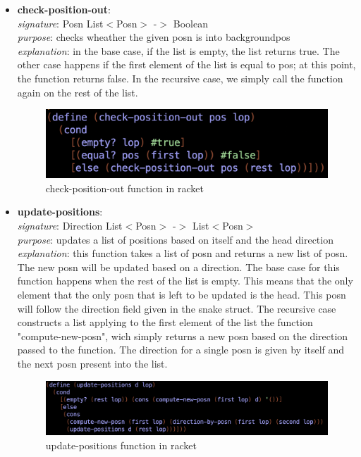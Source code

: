 \documentclass{article}
\begin{document}
\begin{itemize}
		\item \textbf{check-position-out}: \\
			\emph{signature}: Posn List$<$Posn$>$ -$>$ Boolean \\
			\emph{purpose}: checks wheather the given posn is into backgroundpos \\
			\emph{explanation}: in the base case, if the list is empty, the list returns true. 
							The other case happens if the first element of the list is equal to pos; at this point, the function returns 								false.
							In the recursive case, we simply call the function again on the rest of the list.
			\begin{figure}[h!]
				\centering
				\includegraphics[width=.6\linewidth]{check-position-out.png}
				\caption{check-position-out function in racket}
			\end{figure}
			
		\item \textbf{update-positions}: \\
			\emph{signature}: Direction List$<$Posn$>$ -$>$ List$<$Posn$>$ \\
			\emph{purpose}: updates a list of positions based on itself and the head direction \\
			\emph{explanation}: this function takes a list of posn and returns a new list of posn. The new posn will be updated based on a 							direction. 
							The base case for this function happens when the rest of the list is empty. This means that the only 									element that the only posn that is left to be updated is the head. This posn will follow the direction field 								given in the snake struct. The recursive case constructs a list applying to the first element of the list the 								function "compute-new-posn", wich simply returns a new posn based on the direction passed to the 									function. The direction for a single posn is given by itself and the next posn present into the list.
			\begin{figure}[h!]
				\centering
				\includegraphics[width=.6\linewidth]{update-positions.png}
				\caption{update-positions function in racket}
			\end{figure}
	\end{itemize}
	
\end{document}
